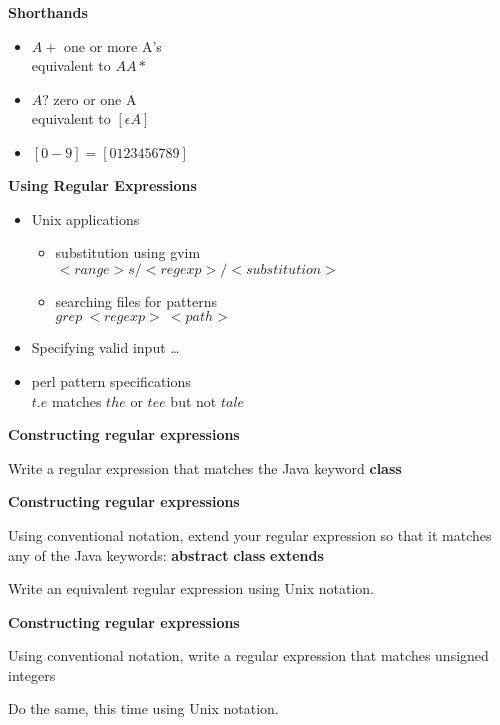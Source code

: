 %
%
\begin{slide}{}
{\bf Shorthands}
\begin{itemize}
\item $ A+ $ one or more A's\\
equivalent to $ AA* $
\item $ A? $ zero or one A \\
equivalent to $[\epsilon A]$
\item $ [0-9] = [0123456789] $
\end{itemize}
\end{slide}
%
%
\begin{slide}{}
{\bf Using Regular Expressions}
\begin{itemize}
\item Unix applications 
\begin{itemize}
\item substitution using gvim\\{\small $<range>s/<regexp>/<substitution>$}
\item searching files for patterns\\$grep~<regexp>~<path>$
\end{itemize}
\item Specifying valid input \ldots
\vfill
\item perl pattern specifications\\
 $t.e$ matches $the$ or $tee$ but not $tale$
\end{itemize}
\end{slide}
%
%
\begin{slide}{}
{\bf Constructing regular expressions}

Write a regular expression that matches the Java keyword {\bf class}
\vfill
\end{slide}
%
%
\begin{slide}{}
{\bf Constructing regular expressions}

Using conventional notation, extend your regular expression so that it
matches any of the Java keywords: {\bf abstract} {\bf class} {\bf extends}

\vspace{10ex}

Write an equivalent regular expression using Unix notation.

\vspace{10ex}
\end{slide}
%
%
\begin{slide}{}
{\bf Constructing regular expressions}

Using conventional notation,
write a regular expression that matches unsigned integers

\vspace{7ex}

Do the same, this time using Unix notation.

\vspace{7ex}
\end{slide}
